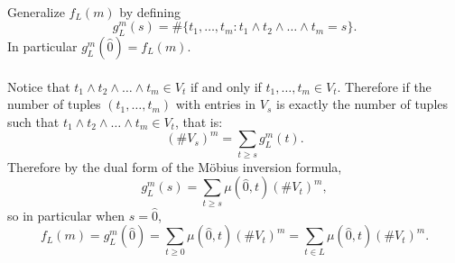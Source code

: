 \documentclass{article}
\newenvironment{solution}[1][Solution.]{\begin{trivlist}
\item[\hskip \labelsep {\bfseries #1}]}{\end{trivlist}}
\newcommand{\set}[1]{\{ #1 \}}
\begin{document}
\begin{solution} \text{} \\
  Generalize $f_L(m)$ by defining \[
    g^m_L(s) = \#\set{t_1, \hdots, t_m : t_1 \wedge t_2 \wedge \hdots \wedge t_m = s}.
  \] In particular $g^m_L(\hat 0) = f_L(m)$.
  \\~\\
  Notice that $t_1 \wedge t_2 \wedge \hdots \wedge t_m \in V_t$ if and only if
  $t_1, \hdots, t_m \in V_t$. Therefore if the number of tuples
  $(t_1, \hdots, t_m)$ with entries in $V_s$ is exactly the number of tuples
  such that $t_1 \wedge t_2 \wedge \hdots \wedge t_m \in V_t$, that is:
  \[
    (\#V_s)^m = \sum_{t \geq s} g_L^m(t).
  \]
  Therefore by the dual form of the M\"obius inversion formula, \[
    g_L^m(s) = \sum_{t \geq s} \mu(\hat 0, t)(\#V_t)^m,
  \] so in particular when $s = \hat 0$, \[
    f_L(m) = g_L^m(\hat 0) = \sum_{t \geq 0} \mu(\hat 0, t)(\#V_t)^m
    = \sum_{t \in L} \mu(\hat 0, t)(\#V_t)^m.
  \]
\end{solution}
\end{document}
